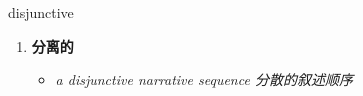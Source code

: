 
\begin{frame}
{\huge disjunctive}
\begin{center}
\begin{enumerate}\Large
  \item \textbf{分离的}
  \begin{itemize}
    \item \em{\Large{a disjunctive narrative sequence 分散的叙述顺序}}
  \end{itemize}
\end{enumerate}
\end{center}
\end{frame}
